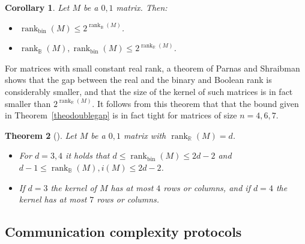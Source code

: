 \documentclass[11pt]{article}
\newtheorem{theorem}{Theorem}
\newtheorem{corollary}[theorem]{Corollary}
\newcommand{\rank}{\mathop{\mathrm{rank}}}
\newcommand{\Rbool}{{\rank}_\mathbb{B}}
\newcommand{\Rbin}{{\rank}_{\mathrm{bin}}}
\newcommand{\Rreal}{{\rank}_\mathbb{R}}
\begin{document}
\begin{corollary}
\label{coro-trivial-upper}
Let $M$ be a $0,1$ matrix. Then:
\begin{itemize}
\item $\Rbin(M) \leq 2^{\Rbool(M)}$.
\item $\Rbool(M), \Rbin(M) \leq 2^{\Rreal(M)}$.
\end{itemize}
\end{corollary}

For matrices with small constant real rank, a theorem of Parnas and Shraibman~\cite{parnas2025study} shows that the gap between the real and the binary and Boolean
rank is considerably smaller, and that the size of the kernel of such matrices is in fact smaller than $2^{\Rreal(M)}$. It follows from this theorem that
that the bound given in Theorem~\ref{theodoublegap} is in fact tight for matrices of size $n = 4,6,7$.

\begin{theorem}[\cite{parnas2025study}]
\label{theoremLowerBound}
Let $M$ be a $0,1$ matrix with $\Rreal(M) = d$.
\begin{itemize}
\item For $d = 3,4$ it holds that $d \leq \Rbin(M) \leq 2d-2$ and $d-1 \leq \Rbool(M), i(M) \leq 2d-2$.
\item
If $d = 3$ the kernel of $M$ has at most $4$ rows or columns, and if $d = 4$ the kernel has at most $7$ rows or columns.
\end{itemize}
\end{theorem}

\subsection{Communication complexity protocols}
\label{subsec-protocols}
\end{document}
